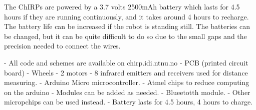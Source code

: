 The ChIRPs are powered by a 3.7 volts 2500mAh battery which lasts for 4.5 hours if they are running continuously, and it takes around 4 hours to recharge. The battery life can be increased if the robot is standing still. The batteries can be changed, but it can be quite difficult to do so due to the small gaps and the precision needed to connect the wires.

- All code and schemes are available on chirp.idi.ntnu.no
- PCB (printed circuit board)
- Wheels
- 2 motors
- 8 infrared emitters and receivers used for distance measuring.
- Arduino Micro microcontroller.
- Atmel chips to reduce computing on the arduino
- Modules can be added as needed.
- Blueetotth module.
- Other micropchips can be used instead.
- Battery lasts for 4.5 hours, 4 hours to charge.

